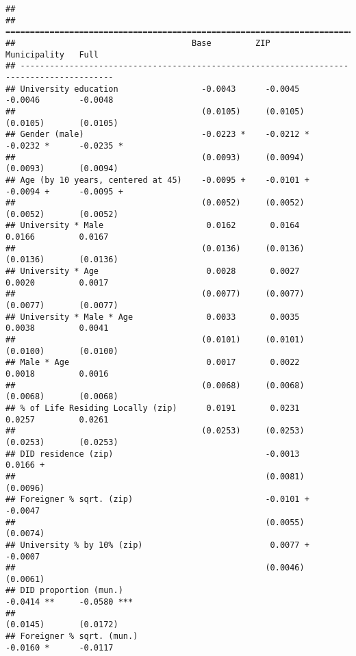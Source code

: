 \documentclass[
]{article}
\begin{document}
\begin{verbatim}
## 
## =========================================================================================
##                                    Base         ZIP          Municipality   Full         
## -----------------------------------------------------------------------------------------
## University education                 -0.0043      -0.0045      -0.0046        -0.0048    
##                                      (0.0105)     (0.0105)     (0.0105)       (0.0105)   
## Gender (male)                        -0.0223 *    -0.0212 *    -0.0232 *      -0.0235 *  
##                                      (0.0093)     (0.0094)     (0.0093)       (0.0094)   
## Age (by 10 years, centered at 45)    -0.0095 +    -0.0101 +    -0.0094 +      -0.0095 +  
##                                      (0.0052)     (0.0052)     (0.0052)       (0.0052)   
## University * Male                     0.0162       0.0164       0.0166         0.0167    
##                                      (0.0136)     (0.0136)     (0.0136)       (0.0136)   
## University * Age                      0.0028       0.0027       0.0020         0.0017    
##                                      (0.0077)     (0.0077)     (0.0077)       (0.0077)   
## University * Male * Age               0.0033       0.0035       0.0038         0.0041    
##                                      (0.0101)     (0.0101)     (0.0100)       (0.0100)   
## Male * Age                            0.0017       0.0022       0.0018         0.0016    
##                                      (0.0068)     (0.0068)     (0.0068)       (0.0068)   
## % of Life Residing Locally (zip)      0.0191       0.0231       0.0257         0.0261    
##                                      (0.0253)     (0.0253)     (0.0253)       (0.0253)   
## DID residence (zip)                               -0.0013                      0.0166 +  
##                                                   (0.0081)                    (0.0096)   
## Foreigner % sqrt. (zip)                           -0.0101 +                   -0.0047    
##                                                   (0.0055)                    (0.0074)   
## University % by 10% (zip)                          0.0077 +                   -0.0007    
##                                                   (0.0046)                    (0.0061)   
## DID proportion (mun.)                                          -0.0414 **     -0.0580 ***
##                                                                (0.0145)       (0.0172)   
## Foreigner % sqrt. (mun.)                                       -0.0160 *      -0.0117    

\end{verbatim}
\end{document}
